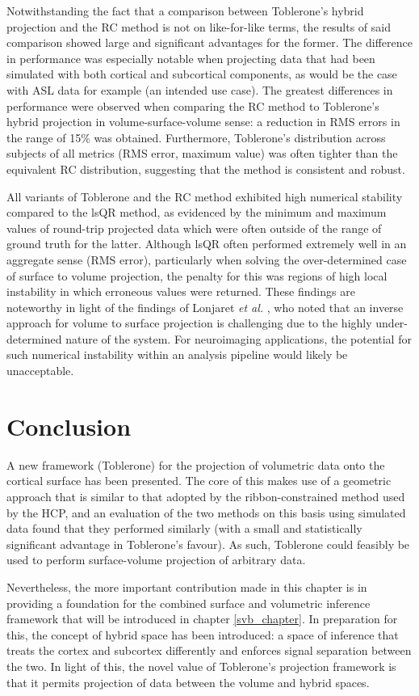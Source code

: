 Notwithstanding the fact that a comparison between Toblerone's hybrid projection and the RC method is not on like-for-like terms, the results of said comparison showed large and significant advantages for the former. The difference in performance was especially notable  when projecting data that had been simulated with both cortical and subcortical components, as would be the case with ASL data for example (an intended use case). The greatest differences in performance were observed when comparing the RC method to Toblerone's hybrid projection in volume-surface-volume sense: a reduction in RMS errors in the range of 15\% was obtained. Furthermore, Toblerone's distribution across subjects of all metrics (RMS error, maximum value) was often tighter than the equivalent RC distribution, suggesting that the method is consistent and robust. 

All variants of Toblerone and the RC method exhibited high numerical stability compared to the lsQR method, as evidenced by the minimum and maximum values of round-trip projected data which were often outside of the range of ground truth for the latter. Although lsQR often performed extremely well in an aggregate sense (RMS error), particularly when solving the over-determined case of surface to volume projection, the penalty for this was regions of high local instability in which erroneous values were returned. These findings are noteworthy in light of the findings of Lonjaret \textit{et al.} \cite{Lonjaret2017}, who noted that an inverse approach for volume to surface projection is challenging due to the highly under-determined nature of the system. For neuroimaging applications, the potential for such numerical instability within an analysis pipeline would likely be unacceptable. 

\section{Conclusion}

A new framework (Toblerone) for the projection of volumetric data onto the cortical surface has been presented. The core of this makes use of a geometric approach that is similar to that adopted by the ribbon-constrained method used by the HCP, and an evaluation of the two methods on this basis using simulated data found that they performed similarly (with a small and statistically significant advantage in Toblerone's favour). As such, Toblerone could feasibly be used to perform surface-volume projection of arbitrary data. 

Nevertheless, the more important contribution made in this chapter is in providing a foundation for the combined surface and volumetric inference framework that will be introduced in chapter \ref{svb_chapter}. In preparation for this, the concept of hybrid space has been introduced: a space of inference that treats the cortex and subcortex differently and enforces signal separation between the two. In light of this, the novel value of Toblerone's projection framework is that it permits projection of data between the volume and hybrid spaces. 




